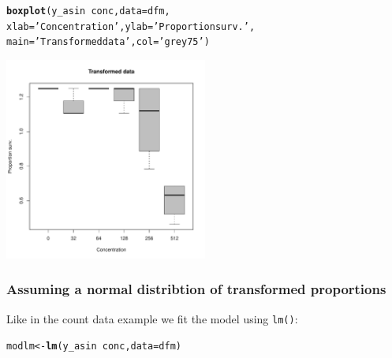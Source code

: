 \documentclass{scrartcl}\usepackage[]{graphicx}\usepackage[]{color}
\makeatletter
\newcommand{\hlstr}[1]{\textcolor[rgb]{0.192,0.494,0.8}{#1}}%
\newcommand{\hlopt}[1]{\textcolor[rgb]{0,0,0}{#1}}%
\newcommand{\hlstd}[1]{\textcolor[rgb]{0.345,0.345,0.345}{#1}}%
\newcommand{\hlkwb}[1]{\textcolor[rgb]{0.69,0.353,0.396}{#1}}%
\newcommand{\hlkwc}[1]{\textcolor[rgb]{0.333,0.667,0.333}{#1}}%
\newcommand{\hlkwd}[1]{\textcolor[rgb]{0.737,0.353,0.396}{\textbf{#1}}}%
\newenvironment{kframe}{%
 \def\at@end@of@kframe{}%
 \ifinner\ifhmode%
  \def\at@end@of@kframe{\end{minipage}}%
  \begin{minipage}{\columnwidth}%
 \fi\fi%
 \def\FrameCommand##1{\hskip\@totalleftmargin \hskip-\fboxsep
 \colorbox{shadecolor}{##1}\hskip-\fboxsep
     \hskip-\linewidth \hskip-\@totalleftmargin \hskip\columnwidth}%
 \MakeFramed {\advance\hsize-\width
   \@totalleftmargin\z@ \linewidth\hsize
   \@setminipage}}%
 {\par\unskip\endMakeFramed%
 \at@end@of@kframe}
\newenvironment{knitrout}{}{} %
\makeatother
\begin{document}
\begin{knitrout}
\color{fgcolor}\begin{kframe}
\begin{alltt}
\hlkwd{boxplot}\hlstd{(y_asin} \hlopt{~} \hlstd{conc,} \hlkwc{data} \hlstd{= dfm,}
        \hlkwc{xlab} \hlstd{=} \hlstr{'Concentration'}\hlstd{,} \hlkwc{ylab} \hlstd{=} \hlstr{'Proportion surv.'}\hlstd{,}
        \hlkwc{main} \hlstd{=} \hlstr{'Transformed data'}\hlstd{,} \hlkwc{col} \hlstd{=} \hlstr{'grey75'}\hlstd{)}
\end{alltt}
\end{kframe}
\includegraphics[width=0.5\textwidth]{figure/bin_trans_plot-1} 

\end{knitrout}

\subsubsection{Assuming a normal distribtion of transformed proportions}
Like in the count data example we fit the model using \texttt{lm()}:
\begin{knitrout}
\color{fgcolor}\begin{kframe}
\begin{alltt}
\hlstd{modlm} \hlkwb{<-} \hlkwd{lm}\hlstd{(y_asin} \hlopt{~} \hlstd{conc,} \hlkwc{data} \hlstd{= dfm)}
\end{alltt}
\end{kframe}
\end{knitrout}
\end{document}
